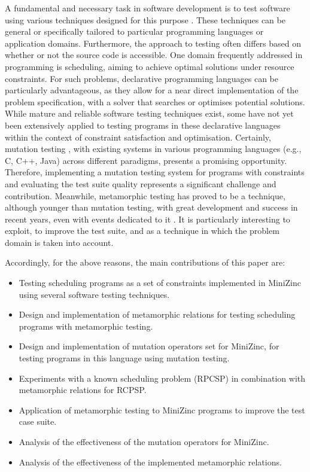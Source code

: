 A fundamental and necessary task in software development is to test software using various techniques designed for this purpose \cite{amman:2008}. These techniques can be general or specifically tailored to particular programming languages or application domains. Furthermore, the approach to testing often differs based on whether or not the source code is accessible. One domain frequently addressed in programming is  scheduling, aiming to achieve optimal solutions under resource constraints. For such problems, declarative programming languages can be particularly advantageous, as they allow for a near direct implementation of the problem specification, with a solver that  searches or optimises potential solutions. While mature and reliable software testing techniques exist, some have not yet been extensively applied to testing programs in these declarative languages within the context of constraint satisfaction and optimisation. Certainly, mutation testing \cite{PAPADAKIS2019275}, with existing systems in various programming languages (e.g., C, C++, Java) across different paradigms, presents a promising opportunity. Therefore, implementing a mutation testing system for programs with constraints and evaluating the test suite quality represents a significant challenge and contribution. Meanwhile, metamorphic testing has proved to be a technique, although younger than mutation testing, with great development and success in recent years, even with events dedicated to it \cite{Xie:2019:3340651, Chen:2018:MTR:3177787.3143561}. It is particularly interesting to exploit, to improve the test suite, and as a technique in which the problem domain is taken into account.

Accordingly, for the above reasons, the main contributions of this paper are:
\begin{itemize}
    \item Testing scheduling programs as a set of constraints implemented in MiniZinc using several software testing techniques.
    \item Design and implementation of metamorphic relations for testing scheduling programs with metamorphic testing.
    \item Design and implementation of mutation operators set for MiniZinc, for testing programs in this language using mutation testing.
    \item  Experiments with a known scheduling problem (RPCSP) in combination with metamorphic relations for RCPSP.
    \item Application of metamorphic testing to MiniZinc programs to improve the test case suite.
    \item Analysis of the effectiveness of the mutation operators for MiniZinc.
    \item Analysis of the effectiveness of the implemented metamorphic relations.
\end{itemize}

